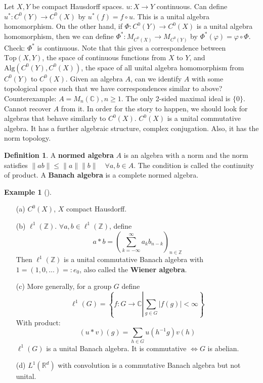 \documentclass{article}
\theoremstyle{definition}
\newtheorem{ex}{Example}
\newtheorem{dfn}{Definition}
\newenvironment{exs}[1][]{%
  \begin{ex}[#1]$ $\par\nobreak\ignorespaces
}{%
  \end{ex}
}
\newcommand{\CC}{\mathbb C}
\newcommand{\RR}{\mathbb R}
\newcommand{\ZZ}{\mathbb Z}
\newcommand{\Lra}{\Leftrightarrow}
\begin{document}
Let $X, Y$ be compact Hausdorff spaces.
$u: X \to Y$ continuous.
Can define $u^*: C^0(Y) \to C^0(X)$ by $u^*(f) = f \circ u$.
This is a unital algebra homomorphism.
On the other hand, if $\Phi: C^0(Y) \to C^0(X)$ is a unital algebra homomorphism, then we can define $\Phi^*: M_{C^0(X)} \to M_{C^0(Y)}$ by $\Phi^*(\varphi) = \varphi \circ \Phi$.
Check: $\Phi^*$ is continuous.
Note that this gives a correspondence between $\text{Top}(X, Y)$, the space of continuous functions from $X$ to $Y$, and $\text{Alg}(C^0(Y), C^0(X))$, the space of all unital algebra homomorphism from $C^0(Y)$ to $C^0(X)$.
Given an algebra $A$, can we identify $A$ with some topological space such that we have correspondences similar to above?
Counterexample: $A = M_n(\CC), n \geq 1$.
The only 2-sided maximal ideal is $\{0\}$.
Cannot recover $A$ from it.
In order for the story to happen, we should look for algebras that behave similarly to $C^0(X)$.
$C^0(X)$ is a unital commutative algebra.
It has a further algebraic structure, complex conjugation.
Also, it has the norm topology.

\begin{dfn}
	A \textbf{normed algebra} $A$ is an algebra with a norm and the norm satisfies $\|ab\| \leq \|a\|\|b\| \quad \forall a, b \in A$.
	The condition is called the continuity of product.
	A \textbf{Banach algebra} is a complete normed algebra.
\end{dfn}

\begin{exs}
	\begin{enumerate}
		\item[(a)] $C^0(X)$, $X$ compact Hausdorff.

		\item[(b)] $\ell^1(\ZZ)$.
			$\forall a, b \in \ell^1(\ZZ)$, define
			\[
				a * b = \left( \sum_{k = -\infty}^\infty a_k b_{n - k} \right)_{n \in \ZZ}
			\]
			Then $\ell^1(\ZZ)$ is a unital commutative Banach algebra with $1 = (1, 0, ...) =: e_0$, also called the \textbf{Wiener algebra}.

		\item[(c)] More generally, for a group $G$ define 
			\[
				\ell^1(G) = \left\{ f: G \to \CC \left| \sum_{g \in G} |f(g)| < \infty \right.\right\}
			\]
			With product:
			\[
				(u * v) (g) = \sum_{h \in G} u(h^{-1} g) v(h)
			\]
			$\ell^1(G)$ is a unital Banach algebra.
			It is commutative $\Lra G$ is abelian.

		\item[(d)] $L^1(\RR^d)$ with convolution is a commutative Banach algebra but not unital.
	\end{enumerate}
\end{exs}
\end{document}
